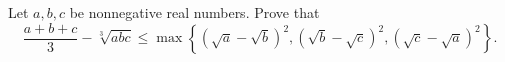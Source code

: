 Let $a,b,c$ be nonnegative real numbers. Prove that \[\frac{a+b+c}{3}-\sqrt[3]{abc}\leq\max\left\{\left(\sqrt{a}-\sqrt{b}\right)^2,\left(\sqrt{b}-\sqrt{c}\right)^2,\left(\sqrt{c}-\sqrt{a}\right)^2\right\}.\]